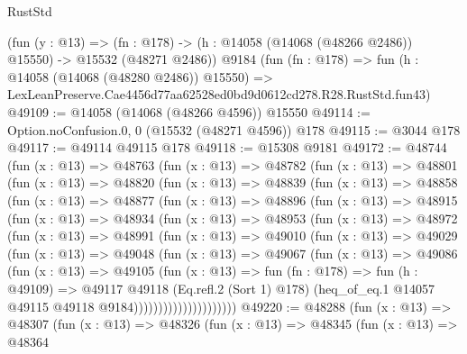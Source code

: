 \begin{lexlean}{RustStd}
\begin{coremodule}
    (fun (y : @13) =>
    (fn : @178) -> (h : @14058 (@14068 (@48266 @2486)) @15550) -> @15532 (@48271 @2486))
    @9184
    (fun (fn : @178) =>
    fun (h : @14058 (@14068 (@48280 @2486)) @15550) =>
    LexLeanPreserve.Cae4456d77aa62528ed0bd9d0612cd278.R28.RustStd.fun43)
@49109 := @14058 (@14068 (@48266 @4596)) @15550
@49114 := Option.noConfusion.{0, 0} (@15532 (@48271 @4596)) @178
@49115 := @3044 @178
@49117 := @49114 @49115 @178
@49118 := @15308 @9181
@49172 := @48744
    (fun (x : @13) =>
    @48763
      (fun (x : @13) =>
      @48782
        (fun (x : @13) =>
        @48801
          (fun (x : @13) =>
          @48820
            (fun (x : @13) =>
            @48839
              (fun (x : @13) =>
              @48858
                (fun (x : @13) =>
                @48877
                  (fun (x : @13) =>
                  @48896
                    (fun (x : @13) =>
                    @48915
                      (fun (x : @13) =>
                      @48934
                        (fun (x : @13) =>
                        @48953
                          (fun (x : @13) =>
                          @48972
                            (fun (x : @13) =>
                            @48991
                              (fun (x : @13) =>
                              @49010
                                (fun (x : @13) =>
                                @49029
                                  (fun (x : @13) =>
                                  @49048
                                    (fun (x : @13) =>
                                    @49067
                                      (fun (x : @13) =>
                                      @49086
                                        (fun (x : @13) =>
                                        @49105
                                          (fun (x : @13) =>
                                          fun (fn : @178) =>
                                          fun (h : @49109) =>
                                          @49117
                                            @49118
                                            (Eq.refl.{2} (Sort 1) @178)
                                            (heq_of_eq.{1}
                                              @14057
                                              @49115
                                              @49118
                                              @9184)))))))))))))))))))))
@49220 := @48288
    (fun (x : @13) =>
    @48307
      (fun (x : @13) =>
      @48326
        (fun (x : @13) =>
        @48345
          (fun (x : @13) =>
          @48364

\end{coremodule}
\end{lexlean}
